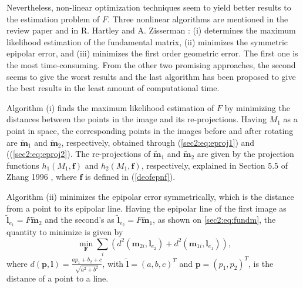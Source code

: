Nevertheless, non-linear optimization techniques seem to yield better results to the estimation problem of $F$. Three nonlinear algorithms are mentioned in the review paper \cite{detep} and in R. Hartley and A. Zisserman \cite{multiview}: (i) determines the maximum likelihood estimation of the fundamental matrix, (ii) minimizes the symmetric epipolar error, and (iii) minimizes the first order geometric error. The first one is the most time-consuming. From the other two promising approaches, the second seems to give the worst results and the last algorithm has been proposed to give the best results in the least amount of computational time. 

Algorithm (i) finds the maximum likelihood estimation of $F$ by minimizing the distances between the points in the image and its re-projections. Having $M_1$ as a point in space, the corresponding points in the images before and after rotating are $\widetilde{\mathbf{m}}_{1}$ and $\widetilde{\mathbf{m}}_{2}$, respectively, obtained through  (\ref{sec2:eq:eproj1}) and ((\ref{sec2:eq:eproj2}).
The re-projections of $\widetilde{\mathbf{m}}_{1}$ and $\widetilde{\mathbf{m}}_{2}$ are given by the projection functions $h_1(M_1, \mathbf{f})$ and $h_2(M_1, \mathbf{f})$, respectively, explained in Section 5.5 of Zhang 1996 \cite{detep}, where $\mathbf{f}$ is defined in (\ref{deofepnf}).

Algorithm (ii) minimizes the epipolar error symmetrically, which is the distance from a point to its epipolar line. Having the epipolar line of the first image as $\widetilde{\mathbf{l}}_{e_1} =  F\widetilde{\mathbf{m}}_{2}$ and the second's as $\widetilde{\mathbf{l}}_{e_2} =  F\widetilde{\mathbf{m}}_{1}$, as shown on \ref{sec2:eq:fundm}, the quantity to minimize is given by
\begin{equation}
	\min _{\mathbf{F}} \sum_{i}\left(d^{2}\left(\mathbf{m}_{2i}, \mathbf{l}_{e_{2}}\right)+d^{2}\left(\mathbf{m}_{1i}, \mathbf{l}_{e_{1}}\right)\right),
\end{equation}
where $d\left(\mathbf{p}, \mathbf{l}\right)=\frac{a p_{1}+b _{2}+c}{\sqrt{a^{2}+b^{2}}}$, with $\widetilde{\mathbf{l}} = (a, b, c)^{T}$
and $\mathbf{p}=\left(p_{1}, p_{2}\right)^{T}$, is the distance of a point to a line.

